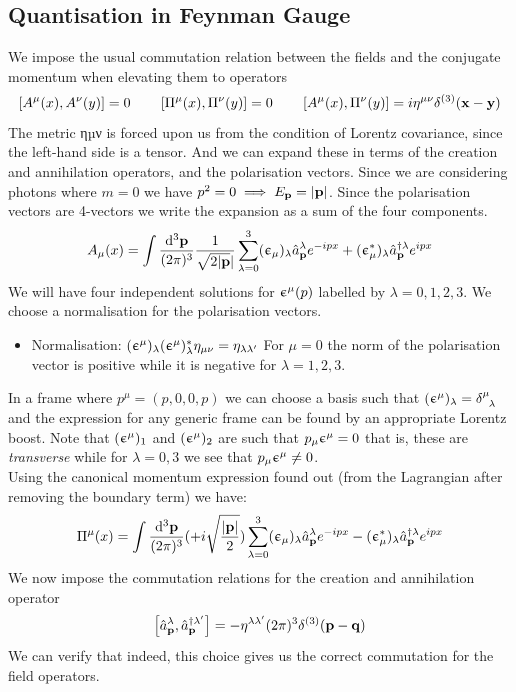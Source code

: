 \subsection{Quantisation in Feynman Gauge}
We impose the usual commutation relation between the fields and the conjugate momentum when elevating them to operators
$$\left[ A^\mu(x), A^\nu(y) \right] = 0\qquad \left[ \Pi^\mu(x), \Pi^\nu(y) \right] = 0\qquad \left[ A^\mu(x), \Pi^\nu(y) \right] = i\eta^{\mu\nu}\delta^{(3)}(\vb{x}-\vb{y})$$
The metric ηµν is forced upon us from the condition of Lorentz covariance, since the left-hand side is a tensor. And we can expand these in terms of the creation and annihilation operators, and the polarisation vectors. Since we are considering photons where $m = 0$ we have $p^2=0 \implies E_{\vb{p}} = |\vb{p}|$. Since the polarisation vectors are  4-vectors we write the expansion as a sum of the four components. 
\begin{equation}\label{eqn:field}
    A_\mu(x) = \int \frac{\dd^3\vb{{\vb{p}}}}{(2\pi)^3} \frac{1}{\sqrt{2|\vb{p}}|}\sum\limits_{\lambda = 0}^3 (\upepsilon_\mu)_\lambda \hat{a}_{\vb{p}}^\lambda e^{-ipx} +(\upepsilon_\mu^*)_\lambda \hat{a}_{\vb{p}}^{\dagger\lambda} e^{ipx}
\end{equation}
We will have four independent solutions for $\upepsilon^\mu(p)$ labelled by $\lambda=0,1,2,3$. We choose a normalisation for the polarisation vectors. 
\begin{itemize}
    \item[$\vartriangleright$] Normalisation: $(\upepsilon^\mu)_\lambda ({\upepsilon^\mu})^*_\lambda \eta_{\mu\nu} = \eta_{\lambda \lambda'}$ 
    For $\mu=0$ the norm of the polarisation vector is positive while it is negative for $\lambda=1,2,3$.
\end{itemize}
In a frame where $p^\mu = (p,0,0,p)$ we can choose a basis such that $(\uep^\mu)_\lambda = \delt{\mu}{\lambda}$ and the expression for any generic frame can be found by an appropriate Lorentz boost. Note that $(\upepsilon^\mu)_1$ and $(\upepsilon^\mu)_2$ are such that $p_\mu \upepsilon^\mu =0$ that is, these are \textit{transverse} while for $\lambda=0,3$ we see that $p_\mu \upepsilon^\mu \neq 0$.\\[0.2cm]
Using the canonical momentum expression found out (from the Lagrangian after removing the boundary term) we have:
\begin{equation}\label{eqn:mome}
    \Pi^\mu(x) = \int \frac{\dd^3\vb{{\vb{p}}}}{(2\pi)^3} (+i\sqrt{\frac{|\vb{p}|}{2}})\sum\limits_{\lambda = 0}^3 (\upepsilon_\mu)_\lambda \hat{a}_{\vb{p}}^\lambda e^{-ipx} -(\upepsilon_\mu^*)_\lambda \hat{a}_{\vb{p}}^{\dagger\lambda} e^{ipx}
\end{equation}
We now impose the commutation relations for the creation and annihilation operator
$$\left[ \hat{a}_{\vb{p}}^\lambda, \hat{a}_{\vb{p}}^{\dagger\lambda'} \right] = -\eta^{\lambda\lambda'}(2\pi)^3\delta^{(3)}(\vb{p}-\vb{q})$$
We can verify that indeed, this choice gives us the correct commutation for the field operators. 

